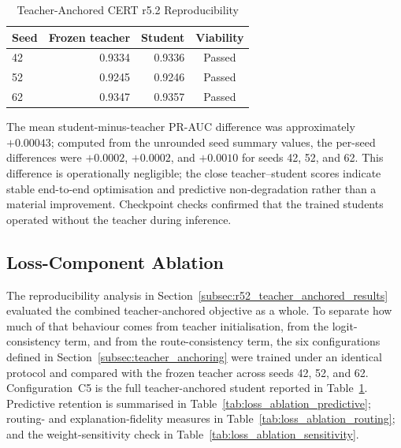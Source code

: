 \begin{table}[!tbp]
\caption{Teacher-Anchored CERT r5.2 Reproducibility}
\label{tab:r52_teacher_reproducibility}
\centering
\footnotesize
\renewcommand{\arraystretch}{1.08}
\setlength{\tabcolsep}{2pt}
\begin{tabular*}{\columnwidth}
{@{\extracolsep{\fill}}lrrc@{}}
\hline
\textbf{Seed} &
\textbf{Frozen teacher} &
\textbf{Student} &
\textbf{Viability} \\
\hline
42 & 0.9334 & 0.9336 & Passed \\
52 & 0.9245 & 0.9246 & Passed \\
62 & 0.9347 & 0.9357 & Passed \\
\hline
\end{tabular*}
\end{table}

The mean student-minus-teacher PR-AUC difference was approximately
\(+0.00043\); computed from the unrounded seed summary values, the per-seed
differences were \(+0.0002\), \(+0.0002\), and \(+0.0010\) for seeds 42, 52, and 62. This difference is operationally
negligible; the close teacher--student scores indicate stable end-to-end
optimisation and predictive non-degradation rather than a material
improvement. Checkpoint checks confirmed that the trained students operated
without the teacher during inference.

\subsection{Loss-Component Ablation}
\label{subsec:loss_ablation}
The reproducibility analysis in
Section~\ref{subsec:r52_teacher_anchored_results} evaluated the combined
teacher-anchored objective as a whole. To separate how much of that behaviour
comes from teacher initialisation, from the logit-consistency term, and from
the route-consistency term, the six configurations defined in
Section~\ref{subsec:teacher_anchoring} were trained under an identical
protocol and compared with the frozen teacher across seeds 42, 52, and 62.
Configuration~C5 is the full teacher-anchored student reported in
Table~\ref{tab:r52_teacher_reproducibility}. Predictive retention is
summarised in Table~\ref{tab:loss_ablation_predictive}; routing- and
explanation-fidelity measures in
Table~\ref{tab:loss_ablation_routing}; and the weight-sensitivity check in
Table~\ref{tab:loss_ablation_sensitivity}.
\smallskip 

